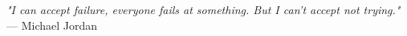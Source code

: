 \begin{flushright}
    \textit{"I can accept failure, everyone fails at something. But I can't accept not trying."}\\
    --- Michael Jordan
\end{flushright}
